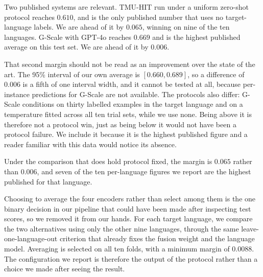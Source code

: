 
Two published systems are relevant. TMU-HIT run under a uniform
zero-shot protocol reaches $0.610$, and is the only published number
that uses no target-language labels. We are ahead of it by $0.065$,
winning on nine of the ten languages. G-Scale with GPT-4o reaches
$0.669$ and is the highest published average on this test set. We are
ahead of it by $0.006$.

That second margin should not be read as an improvement over the state
of the art. The 95\% interval of our own average is $[0.660, 0.689]$,
so a difference of $0.006$ is a fifth of one interval width, and it
cannot be tested at all, because per-instance predictions for G-Scale
are not available. The protocols also differ: G-Scale conditions on
thirty labelled examples in the target language and on a temperature
fitted across all ten trial sets, while we use none. Being above it is
therefore not a protocol win, just as being below it would not have
been a protocol failure. We include it because it is the highest
published figure and a reader familiar with this data would notice its
absence.

Under the comparison that does hold protocol fixed, the margin is
$0.065$ rather than $0.006$, and seven of the ten per-language figures
we report are the highest published for that language.



Choosing to average the four encoders rather than select among them is
the one binary decision in our pipeline that could have been made after
inspecting test scores, so we removed it from our hands. For each
target language, we compare the two alternatives using only the other
nine languages, through the same leave-one-language-out criterion that
already fixes the fusion weight and the language model. Averaging is
selected on all ten folds, with a minimum margin of $0.0088$. The
configuration we report is therefore the output of the protocol rather
than a choice we made after seeing the result.

